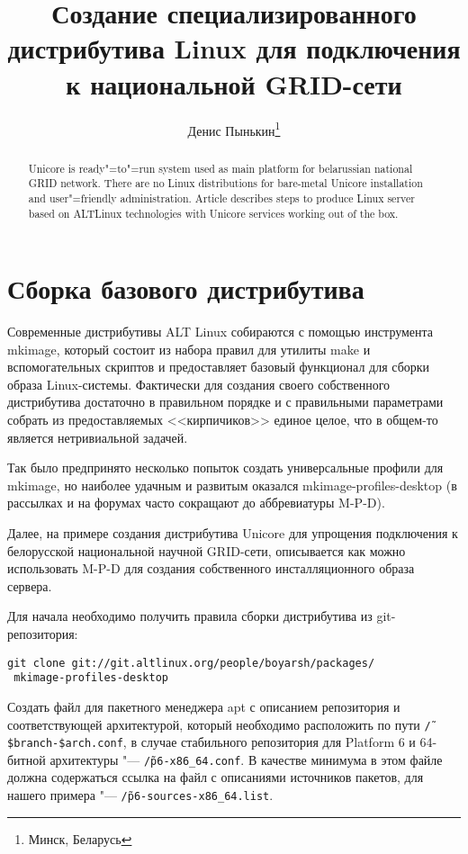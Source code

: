 \documentclass[10pt, a5paper]{article}
\begin{document}
\title{Создание специализированного дистрибутива Linux для подключения к национальной GRID-сети}
\author{Денис Пынькин\footnote{Минск, Беларусь}}
\def\progref!#1!{\texttt{#1}}

\maketitle

\begin{abstract}
Unicore is ready"=to"=run system used as main platform for belarussian national GRID network. 
There are no Linux distributions for bare-metal Unicore installation and user"=friendly administration. 
Article describes steps to produce Linux server based on ALTLinux technologies with Unicore services working out of the box.
\end{abstract}

\section*{Сборка базового дистрибутива}
Современные дистрибутивы ALT Linux собираются с помощью инструмента mkimage,
который состоит из набора правил для утилиты make и вспомогательных скриптов 
и предоставляет базовый функционал для сборки образа Linux-системы. 
Фактически для создания своего собственного дистрибутива достаточно в 
правильном порядке и с правильными параметрами собрать из предоставляемых 
<<кирпичиков>> единое целое, что в общем-то является нетривиальной задачей.

Так было предпринято несколько попыток создать универсальные профили для mkimage,
но наиболее удачным и развитым оказался mkimage-profiles-desktop 
(в рассылках и на форумах часто сокращают до аббревиатуры M-P-D).

Далее, на примере создания дистрибутива Unicore для упрощения подключения к 
белорусской национальной научной GRID-сети, описывается как можно 
использовать M-P-D для создания собственного инсталляционного образа сервера.

Для начала необходимо получить правила сборки дистрибутива из git-репозитория:
\begin{verbatim}
git clone git://git.altlinux.org/people/boyarsh/packages/
 mkimage-profiles-desktop
\end{verbatim}

 Создать файл для пакетного менеджера apt с описанием репозитория и соответствующей 
 архитектурой, который необходимо расположить по пути {\tt \~/\$branch-\$arch.conf}, 
 в случае стабильного репозитория для Platform 6 и 64-битной архитектуры "--- \linebreak 
 {\tt \~/p6-x86\_64.conf}. В качестве минимума в этом файле должна содержаться 
 ссылка на файл с описаниями источников пакетов, для нашего примера "---
 {\tt \~/p6-sources-x86\_64.list}.
\end{document}
